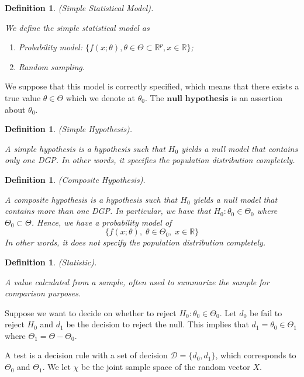 \documentclass[twoside]{article}
\newtheorem{definition}[theorem]{Definition}
\begin{document}
\begin{definition}(Simple Statistical Model).

We define the simple statistical model as
\begin{enumerate}
  \item Probability model: $\{f(x;\theta), \theta \in \Theta \subset \mathbb{R}^p, x \in \mathbb{R}\}$;
  \item Random sampling.
\end{enumerate}
\end{definition}

We suppose that this model is correctly specified, which means that there exists a true value $\theta \in \Theta$ which we denote at $\theta_0$. The $\textbf{null hypothesis}$ is an assertion about $\theta_0$.

\begin{definition}(Simple Hypothesis).

A simple hypothesis is a hypothesis such that $H_0$ yields a null model that contains only one DGP. In other words, it specifies the population distribution completely.
\end{definition}

\begin{definition}(Composite Hypothesis).

A composite hypothesis is a hypothesis such that $H_0$ yields a null model that contains more than one DGP. In particular, we have that $H_0: \theta_0 \in \Theta_0$ where $\Theta_0 \subset \Theta$. Hence, we have a probability model of
$$
\{f(x;\theta), \; \theta \in \Theta_0, \; x \in \mathbb{R}\}
$$
In other words, it does not specify the population distribution completely.
\end{definition}

\begin{definition}(Statistic). 

A value calculated from a sample, often used to summarize the sample for comparison purposes.
\end{definition}

Suppose we want to decide on whether to reject $H_0: \theta_0 \in \Theta_0$. Let $d_0$ be fail to reject $H_0$ and $d_1$ be the decision to reject the null. This implies that $d_1 = \theta_0 \in \Theta_1$ where $\Theta_1 = \Theta - \Theta_0$.

A test is a decision rule with a set of decision $\mathcal{D} = \{d_0,d_1\}$, which corresponds to $\Theta_0$ and $\Theta_1$. We let $\chi$ be the joint sample space of the random vector $X$. 
\end{document}
